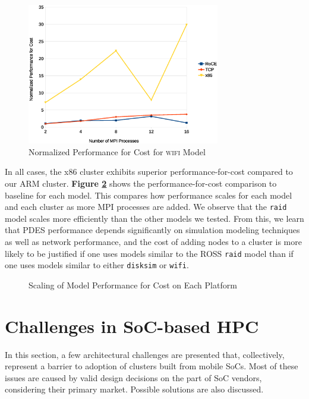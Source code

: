 \documentclass[11pt]{book}
\begin{document}
\begin{figure}
\centering
\includegraphics[width=0.75\textwidth]{wifi_costperf}
\caption{Normalized Performance for Cost for \textsc{wifi} Model}
\label{wifi-costperf}
\end{figure}

In all cases, the x86 cluster exhibits superior performance-for-cost compared to
our ARM cluster. \textbf{Figure \ref{costperf-summary}} shows the
performance-for-cost comparison to baseline for each model. This compares how
performance scales for each model and each cluster as more MPI processes are
added. We observe that the \verb;raid; model scales more efficiently than the
other models we tested. From this, we learn that PDES performance depends
significantly on simulation modeling techniques as well as network
performance, and the cost of adding nodes to a cluster is more likely to be
justified if one uses models similar to the ROSS \verb;raid; model than if one
uses models similar to either \verb;disksim; or \verb;wifi;.

\begin{figure}
\centering
\caption{Scaling of Model Performance for Cost on Each Platform}
\label{costperf-summary}
\end{figure}

\section{\textbf{Challenges in SoC-based HPC}}

In this section, a few architectural challenges are presented that,
collectively, represent a barrier to adoption of clusters built from mobile
SoCs. Most of these issues are caused by valid design decisions on the part of
SoC vendors, considering their primary market. Possible solutions are also
discussed.
\end{document}
